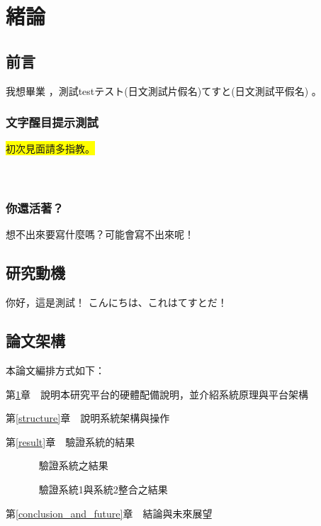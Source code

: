 \chapter{緒論}\label{explanation}


\section{前言}\label{1-1}
我想畢業 \cite{talbot97}，測試testテスト(日文測試片假名)てすと(日文測試平假名)\cite{m1} 。

\subsection{文字醒目提示測試}
\colorbox{yellow}{初次見面請多指教。} \\
\color{blue}{初めまして、よろしくお願いします！} \\
 \\
\color{black}

\subsection{你還活著？}
想不出來要寫什麼嗎？可能會寫不出來呢！\cite{goossens97}

\newpage

\section{研究動機}\label{1-2}
你好，這是測試！
こんにちは、これはてすとだ！

\newpage

\section{論文架構}\label{1-3}
\n 本論文編排方式如下：

第\ref{explanation}章　說明本研究平台的硬體配備說明，並介紹系統原理與平台架構

第\ref{structure}章　說明系統架構與操作

第\ref{result}章　驗證系統的結果
		
　　　      驗證系統之結果

　　　      驗證系統1與系統2整合之結果

第\ref{conclusion_and_future}章　結論與未來展望
